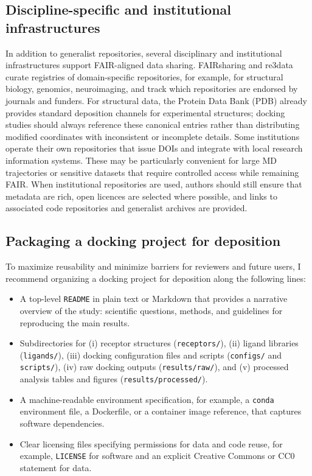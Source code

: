 \documentclass[12pt]{article}
\begin{document}
\subsection{Discipline-specific and institutional infrastructures}

In addition to generalist repositories, several disciplinary and institutional infrastructures support FAIR-aligned data sharing. FAIRsharing and re3data curate registries of domain-specific repositories, for example, for structural biology, genomics, neuroimaging, and track which repositories are endorsed by journals and funders.\cite{CH12_helpingFAIR2019,CH12_publisherReqs} For structural data, the Protein Data Bank (PDB) already provides standard deposition channels for experimental structures; docking studies should always reference these canonical entries rather than distributing modified coordinates with inconsistent or incomplete details. Some institutions operate their own repositories that issue DOIs and integrate with local research information systems. These may be particularly convenient for large MD trajectories or sensitive datasets that require controlled access while remaining FAIR.\cite{CH12_helpingFAIR2019,CH12_snsfRepos} When institutional repositories are used, authors should still ensure that metadata are rich, open licences are selected where possible, and links to associated code repositories and generalist archives are provided.

\subsection{Packaging a docking project for deposition}

To maximize reusability and minimize barriers for reviewers and future users, I recommend organizing a docking project for deposition along the following lines:

\begin{itemize}
  \item A top-level \texttt{README} in plain text or Markdown that provides a narrative overview of the study: scientific questions, methods, and guidelines for reproducing the main results.
  \item Subdirectories for (i) receptor structures (\texttt{receptors/}), (ii) ligand libraries (\texttt{ligands/}), (iii) docking configuration files and scripts (\texttt{configs/} and \texttt{scripts/}), (iv) raw docking outputs (\texttt{results/raw/}), and (v) processed analysis tables and figures (\texttt{results/processed/}).
  \item A machine-readable environment specification, for example, a \texttt{conda} environment file, a Dockerfile, or a container image reference, that captures software dependencies.
  \item Clear licensing files specifying permissions for data and code reuse, for example, \texttt{LICENSE} for software and an explicit Creative Commons or CC0 statement for data.
\end{itemize}
\end{document}
